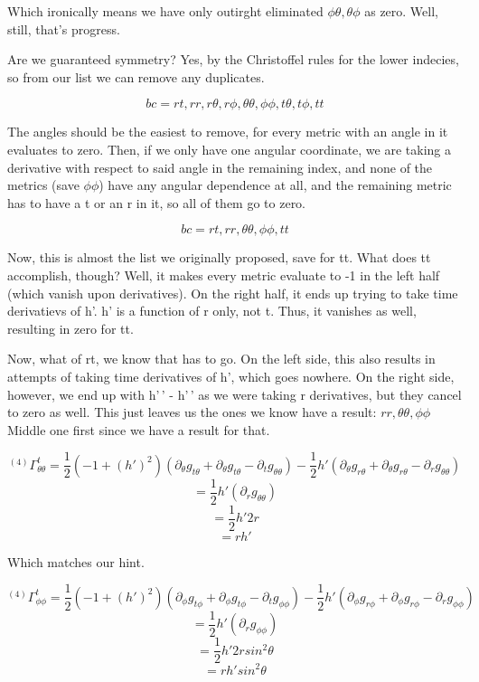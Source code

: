 \documentclass[landscape,letterpaper,10pt,english]{article}
\begin{document}
    Which ironically means we have only outirght eliminated
\(\phi\theta, \theta\phi\) as zero. Well, still, that's progress.

Are we guaranteed symmetry? Yes, by the Christoffel rules for the lower
indecies, so from our list we can remove any duplicates.

\[ bc = rt, rr, r\theta, r\phi, \theta\theta, \phi\phi, t \theta, t \phi, tt \]

The angles should be the easiest to remove, for every metric with an
angle in it evaluates to zero. Then, if we only have one angular
coordinate, we are taking a derivative with respect to said angle in the
remaining index, and none of the metrics (save \(\phi\phi\)) have any
angular dependence at all, and the remaining metric has to have a t or
an r in it, so all of them go to zero.

\[ bc = rt, rr, \theta\theta, \phi\phi, tt \]

    Now, this is almost the list we originally proposed, save for tt. What
does tt accomplish, though? Well, it makes every metric evaluate to -1
in the left half (which vanish upon derivatives). On the right half, it
ends up trying to take time derivatievs of h'. h' is a function of r
only, not t. Thus, it vanishes as well, resulting in zero for tt.

    Now, what of rt, we know that has to go. On the left side, this also
results in attempts of taking time derivatives of h', which goes
nowhere. On the right side, however, we end up with h'\,' - h'\,' as we
were taking r derivatives, but they cancel to zero as well. This just
leaves us the ones we know have a result: \(rr, \theta\theta, \phi\phi\)
Middle one first since we have a result for that.

\[ {}^{(4)}\Gamma^t_{\theta\theta} = \frac12 (-1+(h')^2) (\partial_\theta g_{t\theta} + \partial_\theta g_{t\theta} - \partial_t g_{\theta\theta}) - \frac12 h'(\partial_\theta g_{r\theta} + \partial_\theta g_{r\theta} - \partial_r g_{\theta\theta}) \]
\[  = \frac12 h'( \partial_r g_{\theta\theta}) \] \[  = \frac12 h' 2r \]
\[ = rh' \]

Which matches our hint.

    \[ {}^{(4)}\Gamma^t_{\phi\phi} = \frac12 (-1+(h')^2) (\partial_\phi g_{t\phi} + \partial_\phi g_{t\phi} - \partial_t g_{\phi\phi}) - \frac12 h'(\partial_\phi g_{r\phi} + \partial_\phi g_{r\phi} - \partial_r g_{\phi\phi}) \]
\[  = \frac12 h'(\partial_r g_{\phi\phi}) \]
\[  = \frac12 h'2rsin^2\theta \] \[  =  rh'sin^2\theta \]
\end{document}
